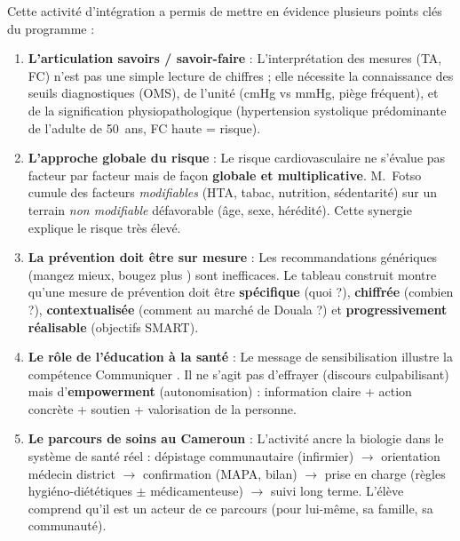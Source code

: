 \documentclass[11pt]{article}
\newcounter{popsec}
\newcounter{popsub}
\newcommand{\courssub}[1]{%
  \stepcounter{popsub}%
  \par\vspace{9pt}\noindent{\popxbold\fontsize{11.5}{13}\selectfont\color{popink}{\color{poporange}\thepopsec.\thepopsub}\hspace{6pt}#1}\par\nopagebreak\vspace{4pt}
}
\begin{document}
\courssub{Bilan de l'activité}
Cette activité d'intégration a permis de mettre en évidence plusieurs points clés du programme :

\begin{enumerate}
    \item \textbf{L'articulation savoirs / savoir-faire} : L'interprétation des mesures (TA, FC) n'est pas une simple lecture de chiffres ; elle nécessite la connaissance des seuils diagnostiques (OMS), de l'unité (cmHg vs mmHg, piège fréquent), et de la signification physiopathologique (hypertension systolique prédominante de l'adulte de 50~ans, FC haute = risque).
    \item \textbf{L'approche globale du risque} : Le risque cardiovasculaire ne s'évalue pas facteur par facteur mais de façon \textbf{globale et multiplicative}. M.~Fotso cumule des facteurs \textit{modifiables} (HTA, tabac, nutrition, sédentarité) sur un terrain \textit{non modifiable} défavorable (âge, sexe, hérédité). Cette synergie explique le risque très élevé.
    \item \textbf{La prévention doit être \og sur mesure \fg} : Les recommandations génériques (\og mangez mieux, bougez plus \fg) sont inefficaces. Le tableau construit montre qu'une mesure de prévention doit être \textbf{spécifique} (quoi ?), \textbf{chiffrée} (combien ?), \textbf{contextualisée} (comment au marché de Douala ?) et \textbf{progressivement réalisable} (objectifs SMART).
    \item \textbf{Le rôle de l'éducation à la santé} : Le message de sensibilisation illustre la compétence \og Communiquer \fg. Il ne s'agit pas d'effrayer (discours culpabilisant) mais d'\textbf{empowerment} (autonomisation) : information claire + action concrète + soutien + valorisation de la personne.
    \item \textbf{Le parcours de soins au Cameroun} : L'activité ancre la biologie dans le système de santé réel : dépistage communautaire (infirmier) $\rightarrow$ orientation médecin district $\rightarrow$ confirmation (MAPA, bilan) $\rightarrow$ prise en charge (règles hygiéno-diététiques $\pm$ médicamenteuse) $\rightarrow$ suivi long terme. L'élève comprend qu'il est un acteur de ce parcours (pour lui-même, sa famille, sa communauté).
\end{enumerate}
\end{document}

